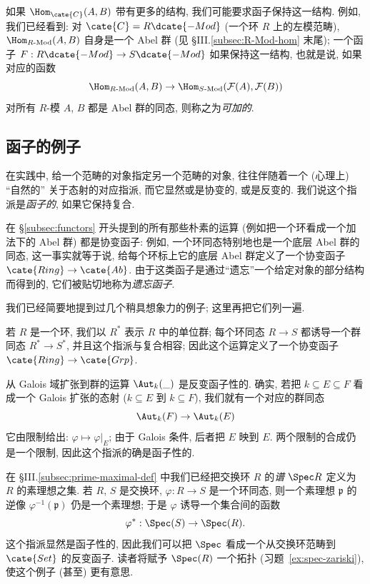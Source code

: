 如果 $\Hom_{\cate{C}}(A,B)$ 带有更多的结构, 我们可能要求函子保持这一结构. 例如, 我们已经看到: 对 $\cate{C}=R\dcate{-Mod}$ (一个环 $R$ 上的左模范畴), $\Hom_{R\text{-Mod}}(A,B)$ 自身是一个 Abel 群 (见 §III.\ref{subsec:R-Mod-hom} 末尾); 一个函子 $F:R\dcate{-Mod}\to S\dcate{-Mod}$ 如果保持这一结构, 也就是说, 如果对应的函数
\[
\Hom_{R\text{-Mod}}(A,B)\to\Hom_{S\text{-Mod}}(\mathcal{F}(A),\mathcal{F}(B))
\]
对所有 $R$-模 $A$, $B$ 都是 Abel 群的同态, 则称之为\emph{可加的}.

\subsection{函子的例子}
\label{subsec:examples-functors}

在实践中, 给一个范畴的对象指定另一个范畴的对象, 往往伴随着一个 (心理上) ``自然的'' 关于态射的对应指派, 而它显然或是协变的, 或是反变的. 我们说这个指派是\emph{函子的}, 如果它保持复合.

在 §\ref{subsec:functors} 开头提到的所有那些朴素的运算 (例如把一个环看成一个加法下的 Abel 群) 都是协变函子: 例如, 一个环同态特别地也是一个底层 Abel 群的同态, 这一事实就等于说, 给每个环标上它的底层 Abel 群定义了一个协变函子 $\cate{Ring}\to\cate{Ab}$. 由于这类函子是通过``遗忘''一个给定对象的部分结构而得到的, 它们被贴切地称为\emph{遗忘函子}.

我们已经简要地提到过几个稍具想象力的例子; 这里再把它们列一遍.

\begin{example}\label{ex:units-functor}
若 $R$ 是一个环, 我们以 $R^{*}$ 表示 $R$ 中的单位群; 每个环同态 $R\to S$ 都诱导一个群同态 $R^{*}\to S^{*}$, 并且这个指派与复合相容; 因此这个运算定义了一个协变函子 $\cate{Ring}\to\cate{Grp}$.
\end{example}

\begin{example}\label{ex:autk-contravariant}
从 Galois 域扩张到群的运算 $\Aut_k(\_)$ 是反变函子性的. 确实, 若把 $k\subseteq E\subseteq F$ 看成一个 Galois 扩张的态射 ($k\subseteq E$ 到 $k\subseteq F$), 我们就有一个对应的群同态
\[
\Aut_k(F)\to\Aut_k(E)
\]
它由限制给出: $\varphi\mapsto\varphi|_E$; 由于 Galois 条件, 后者把 $E$ 映到 $E$. 两个限制的合成仍是一个限制, 因此这个指派的确是函子性的.
\end{example}

\begin{example}\label{ex:spec-functor}
在 §III.\ref{subsec:prime-maximal-def} 中我们已经把交换环 $R$ 的\emph{谱} $\Spec R$ 定义为 $R$ 的素理想之集. 若 $R$, $S$ 是交换环, $\varphi:R\to S$ 是一个环同态, 则一个素理想 $\mathfrak{p}$ 的逆像 $\varphi^{-1}(\mathfrak{p})$ 仍是一个素理想; 于是 $\varphi$ 诱导一个集合间的函数
\[
\varphi^{*}:\Spec(S)\to\Spec(R).
\]
这个指派显然是函子性的, 因此我们可以把 $\Spec$ 看成一个从交换环范畴到 $\cate{Set}$ 的反变函子. 读者将赋予 $\Spec(R)$ 一个拓扑 (习题~\ref{ex:spec-zariski}), 使这个例子 (甚至) 更有意思.
\end{example}

